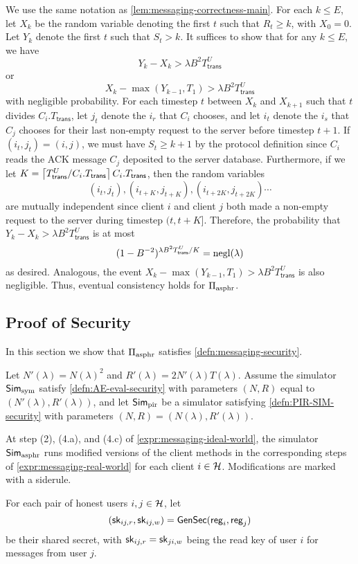  We use the same notation as \cref{lem:messaging-correctness-main}. For each $k \leq E$, let $X_k$ be the random variable denoting the first $t$ such that $R_t \geq k$, with $X_0 = 0$. Let $Y_k$ denote the first $t$ such that $S_{t} > k$. It suffices to show that for any $k \leq E$, we have
 $$Y_k - X_k > \lambda B^2 T^U_{\mathsf{trans}}$$
 or
 $$X_{k} - \max(Y_{k - 1}, T_1) > \lambda B^2 T^U_{\mathsf{trans}}$$
 with negligible probability. For each timestep $t$ between $X_k$ and $X_{k + 1}$ such that $t$ divides $C_i.T_{\mathsf{trans}}$, let $j_t$ denote the $i_r$ that $C_i$ chooses, and let $i_t$ denote the $i_s$ that $C_j$ chooses for their last non-empty request to the server before timestep $t + 1$. If $(i_t, j_t) = (i, j)$, we must have $S_{t} \geq k + 1$ by the protocol definition since $C_i$ reads the ACK message $C_j$ deposited to the server database. Furthermore, if we let $K = \left\lceil T^U_{\mathsf{trans}} / C_i.T_{\mathsf{trans}} \right\rceil C_i.T_{\mathsf{trans}}$, then the random variables
 $$(i_t, j_t), (i_{t + K}, j_{t + K}), (i_{t + 2K}, j_{t + 2K})\cdots$$
are mutually independent since client $i$ and client $j$ both made a non-empty request to the server during timestep $(t, t + K]$. Therefore, the probability that $Y_k - X_k > \lambda B^2 T^U_{\mathsf{trans}}$ is at most
$$(1 - B^{-2})^{\lambda B^2 T^U_{\mathsf{trans}} / K} = \operatorname{negl}(\lambda)$$
as desired. Analogous, the event $X_{k} - \max(Y_{k - 1}, T_1) > \lambda B^2 T^U_{\mathsf{trans}}$ is also negligible. Thus, eventual consistency holds for $\Pi_{\text{asphr}}$.
\subsection{Proof of Security}
In this section we show that $\Pi_{\text{asphr}}$ satisfies \cref{defn:messaging-security}. 

Let $N'(\lambda) = N(\lambda)^2$ and $R'(\lambda) = 2N'(\lambda)T(\lambda)$. Assume the simulator $\mathsf{Sim}_{\text{sym}}$ satisfy \cref{defn:AE-eval-security} with parameters $(N, R)$ equal to $(N'(\lambda), R'(\lambda))$, and let $\mathsf{Sim}_{\text{pir}}$ be a simulator satisfying \cref{defn:PIR-SIM-security} with parameters $(N, R) = (N(\lambda), R'(\lambda))$. 

At step (2), (4.a), and (4.c) of \cref{expr:messaging-ideal-world}, the simulator $\mathsf{Sim}_{\text{asphr}}$ runs modified versions of the client methods in the corresponding steps of \cref{expr:messaging-real-world} for each client $i \in \mathcal{H}$. Modifications are marked with a siderule. 

For each pair of honest users $i, j \in \mathcal{H}$, let 
$$({\mathsf{sk}}_{ij, r}, {\mathsf{sk}}_{ij, w}) = \mathsf{GenSec}(\mathsf{reg}_i, \mathsf{reg}_j)$$ 
be their shared secret, with ${\mathsf{sk}}_{ij, r} = {\mathsf{sk}}_{ji, w}$ being the read key of user $i$ for messages from user $j$.

